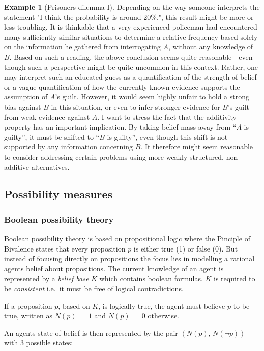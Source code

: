 \documentclass[
]{report}
\theoremstyle{definition}
\newtheorem{example}{Example}[section]
\begin{document}
\begin{example}[Prisoners dilemma I]
Depending on the way someone interprets the statement "I think the probability is around 20\%.", this result might be more or less troubling. It is thinkable that a very experienced policeman had encountered many sufficiently similar situations to determine a relative frequency based solely on the information he gathered from interrogating $A$, without any knowledge of $B$. Based on such a reading, the above conclusion seems quite reasonable - even though such a perspective might be quite uncommon in this context. Rather, one may interpret such an educated guess as a quantification of the strength of belief or a vague quantification of how the currently known evidence supports the assumption of $A$'s guilt. However, it would seem highly unfair to hold a strong bias against $B$ in this situation, or even to infer stronger evidence for $B$’s guilt from weak evidence against $A$. I want to stress the fact that the additivity property has an important implication. By taking belief mass away from “$A$ is guilty”, it must be shifted to “$B$ is guilty”, even though this shift is not supported by any information concerning $B$. It therefore might seem reasonable to consider addressing certain problems using more weakly structured, non-additive alternatives.
\end{example}

\subsection{Possibility measures}

\subsubsection{Boolean possibility theory}

Boolean possibility theory is based on propositional logic where the
Pinciple of Bivalence states that every proposition \(p\) is either true
(1) or false (0). But instead of focusing directly on propositions the
focus lies in modelling a rational agents belief about propositions. The
current knowledge of an agent is represented by a \textit{belief base}
\(K\) which contains boolean formulas. \(K\) is required to be
\textit{consistent} i.e.~it must be free of logical contradictions.

If a proposition \(p\), based on \(K\), is logically true, the agent
must believe \(p\) to be true, written as \(N(p) \, = \, 1\) and
\(N(p) \, = \, 0\) otherwise.

An agents state of belief is then represented by the pair
\((N(p), \, N(\lnot p))\) with 3 possible states:
\end{document}
